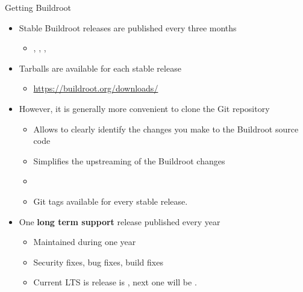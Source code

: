 \begin{frame}{Getting Buildroot}
  \begin{itemize}
  \item Stable Buildroot releases are published every three months
    \begin{itemize}
    \item {}, , ,
    \end{itemize}
  \item Tarballs are available for each stable release
    \begin{itemize}
    \item \url{https://buildroot.org/downloads/}
    \end{itemize}
  \item However, it is generally more convenient to clone the Git
    repository
    \begin{itemize}
    \item Allows to clearly identify the changes you make to the
      Buildroot source code
    \item Simplifies the upstreaming of the Buildroot changes
    \item {}
    \item Git tags available for every stable release.
    \end{itemize}
  \item One {\bf long term support} release published every year
    \begin{itemize}
    \item Maintained during one year
    \item Security fixes, bug fixes, build fixes
    \item Current LTS is release is , next one will be
      .
    \end{itemize}
  \end{itemize}
\end{frame}

